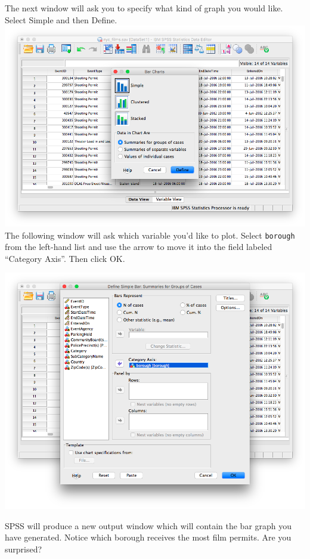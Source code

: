 \documentclass[
]{book}
\begin{document}
The next window will ask you to specify what kind of graph you would like. Select {Simple} and then {Define}.
\includegraphics{img/1.4.15.png}
The following window will ask which variable you'd like to plot. Select \texttt{borough} from the left-hand list and use the arrow to move it into the field labeled ``Category Axis''. Then click {OK}.

\includegraphics{img/1.4.16.png}

SPSS will produce a new output window which will contain the bar graph you have generated. Notice which borough receives the most film permits. Are you surprised?
\end{document}
